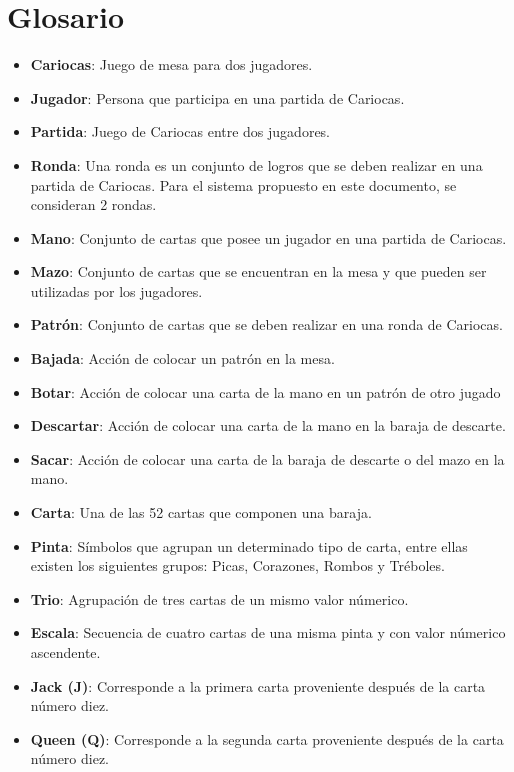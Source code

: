 \section{Glosario}\label{cap:glosario}
\begin{itemize}
        \item \textbf{Cariocas}: Juego de mesa para dos jugadores.
        \item \textbf{Jugador}: Persona que participa en una partida de Cariocas.
        \item \textbf{Partida}: Juego de Cariocas entre dos jugadores.
        \item \textbf{Ronda}: Una ronda es un conjunto de logros que se deben realizar en una partida de Cariocas. Para el sistema propuesto en este documento, se consideran 2 rondas.
        \item \textbf{Mano}: Conjunto de cartas que posee un jugador en una partida de Cariocas.
        \item \textbf{Mazo}: Conjunto de cartas que se encuentran en la mesa y que pueden ser utilizadas por los jugadores.
        \item \textbf{Patrón}: Conjunto de cartas que se deben realizar en una ronda de Cariocas.
        \item \textbf{Bajada}: Acción de colocar un patrón en la mesa.
        \item \textbf{Botar}: Acción de colocar una carta de la mano en un patrón de otro jugado
        \item \textbf{Descartar}: Acción de colocar una carta de la mano en la baraja de descarte.
        \item \textbf{Sacar}: Acción de colocar una carta de la baraja de descarte o del mazo en la mano.
        \item \textbf{Carta}: Una de las 52 cartas que componen una baraja.
        \item \textbf{Pinta}: Símbolos que agrupan un determinado tipo de carta, entre ellas existen los siguientes grupos: Picas, Corazones, Rombos y Tréboles.
        \item \textbf{Trio}: Agrupación de tres cartas de un mismo valor númerico.
        \item \textbf{Escala}: Secuencia de cuatro cartas de una misma pinta y con valor númerico ascendente.
        \item \textbf{Jack (J)}: Corresponde a la primera carta proveniente después de la carta número diez.
        \item \textbf{Queen (Q)}: Corresponde a la segunda carta proveniente después de la carta número diez.
\end{itemize}
\clearpage

\medskip
\printbibliography

